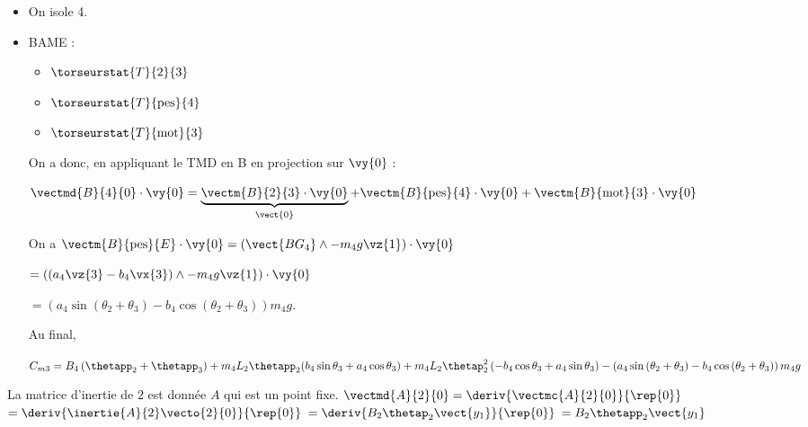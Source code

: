 \ifprof
\begin{corrige}
\begin{itemize}
\item On isole 4.
\item BAME : 
\begin{itemize}
\item $\torseurstat{T}{2}{3}$
\item $\torseurstat{T}{\text{pes}}{4}$
\item $\torseurstat{T}{\text{mot}}{3}$
\end{itemize}
On a donc, en appliquant le TMD en B en projection sur $\vy{0}$ : 

$\vectmd{B}{4}{0}\cdot\vy{0} = \underbrace{\vectm{B}{2}{3}\cdot\vy{0}}_{\vect{0}}
+\vectm{B}{\text{pes}}{4}\cdot\vy{0}+\vectm{B}{\text{mot}}{3}\cdot\vy{0}$

On a 
$\vectm{B}{\text{pes}}{E}\cdot\vy{0} = \left(\vect{BG_4} \wedge -m_4 g \vz{1} \right) \cdot\vy{0}$

$=\left(\left(a_4 \vz{3}-b_4\vx{3} \right)\wedge -m_4 g \vz{1} \right) \cdot\vy{0}$

$=\left(a_4\sin\left( \theta_2+\theta_3\right) -b_4\cos\left( \theta_2+\theta_3\right) \right) m_4 g  $.

Au final, 

$C_{m3} = 
   B_4 \left(\thetapp_2+\thetapp_3\right) 
+ m_4 L_2\thetapp_2 ( b_4\sin\theta_3 +a_4 \cos\theta_3 ) 
+ m_4 L_2\thetap_2^2 \left(- b_4\cos\theta_3+a_4 \sin\theta_3\right)
- \left(a_4\sin\left( \theta_2+\theta_3\right) -b_4\cos\left( \theta_2+\theta_3\right) \right) m_4 g$
\end{itemize}
\end{corrige}
\else
\fi


\ifprof
\begin{corrige}
La matrice d'inertie de $2$ est donnée $A$ qui est un point fixe. 
$\vectmd{A}{2}{0}=\deriv{\vectmc{A}{2}{0}}{\rep{0}}$
$=\deriv{\inertie{A}{2} \vecto{2}{0}}{\rep{0}}$
$=\deriv{B_2\thetap_2 \vect{y_1}}{\rep{0}}$
$=B_2\thetapp_2 \vect{y_1}$


\end{corrige}
\else
\fi

